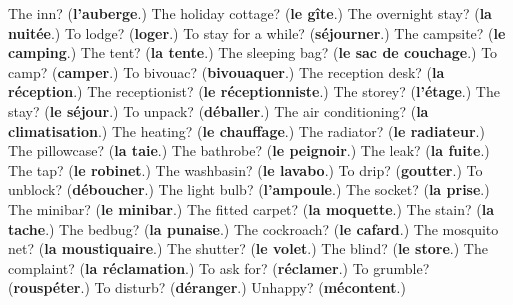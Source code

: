 \begin{tcolorbox}[breakable,colback=teal!4,colframe=teal!35!black,title={Before you move on}]
The inn? (\textbf{l'auberge}.) The holiday cottage? (\textbf{le gîte}.) The overnight stay? (\textbf{la nuitée}.) To lodge? (\textbf{loger}.) To stay for a while? (\textbf{séjourner}.) The campsite? (\textbf{le camping}.) The tent? (\textbf{la tente}.) The sleeping bag? (\textbf{le sac de couchage}.) To camp? (\textbf{camper}.) To bivouac? (\textbf{bivouaquer}.) The reception desk? (\textbf{la réception}.) The receptionist? (\textbf{le réceptionniste}.) The storey? (\textbf{l'étage}.) The stay? (\textbf{le séjour}.) To unpack? (\textbf{déballer}.) The air conditioning? (\textbf{la climatisation}.) The heating? (\textbf{le chauffage}.) The radiator? (\textbf{le radiateur}.) The pillowcase? (\textbf{la taie}.) The bathrobe? (\textbf{le peignoir}.) The leak? (\textbf{la fuite}.) The tap? (\textbf{le robinet}.) The washbasin? (\textbf{le lavabo}.) To drip? (\textbf{goutter}.) To unblock? (\textbf{déboucher}.) The light bulb? (\textbf{l'ampoule}.) The socket? (\textbf{la prise}.) The minibar? (\textbf{le minibar}.) The fitted carpet? (\textbf{la moquette}.) The stain? (\textbf{la tache}.) The bedbug? (\textbf{la punaise}.) The cockroach? (\textbf{le cafard}.) The mosquito net? (\textbf{la moustiquaire}.) The shutter? (\textbf{le volet}.) The blind? (\textbf{le store}.) The complaint? (\textbf{la réclamation}.) To ask for? (\textbf{réclamer}.) To grumble? (\textbf{rouspéter}.) To disturb? (\textbf{déranger}.) Unhappy? (\textbf{mécontent}.)
\end{tcolorbox}
